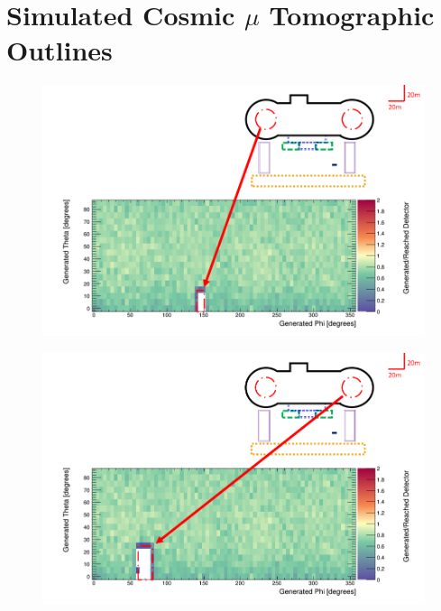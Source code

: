 
\chapter{Simulated Cosmic $\mu$ Tomographic Outlines}

\begin{figure}
 \centering
 \includegraphics[width=\linewidth]{Chapter5/Figs/wylfaRasterNew/reactorCoreFarGen_Reached.png}
 \label{fig:reactorCoreFarGen_Reached}
\end{figure}

\begin{figure}
 \centering
 \includegraphics[width=\linewidth]{Chapter5/Figs/wylfaRasterNew/reactorCoreNearGen_Reached.png}
 \label{fig:reactorCoreNearGen_Reached}
\end{figure}

